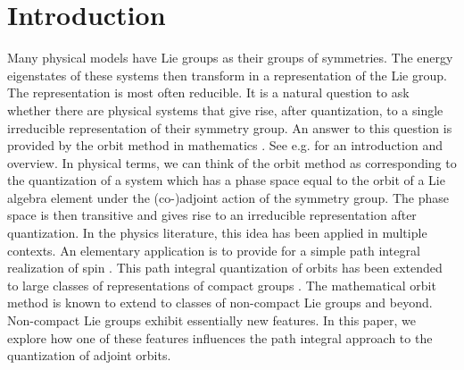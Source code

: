 \documentclass[12pt]{article}
\numberwithin{equation}{section}
\numberwithin{equation}{section}
\numberwithin{table}{section}\setlength{\multlinegap}{25pt}
\begin{document}
\hypersetup{pageanchor=true}


\setcounter{tocdepth}{2}
\tableofcontents

\section{Introduction}
Many physical models have Lie groups  as their groups of symmetries. The energy eigenstates of these systems then transform in a representation of the Lie group. The representation is most often reducible.  It is a natural question to ask whether there are physical systems that give rise, after quantization, to a single irreducible representation of their symmetry group. An answer to this question is provided by the orbit method in mathematics \cite{Kostant,Souriau}. See e.g. \cite{Kirillov} for an introduction and overview. In physical terms, we can think of the orbit method as corresponding to the quantization of a system which has a phase space equal to the  orbit of a Lie algebra element under the (co-)adjoint action of the symmetry group. The phase space is then transitive and gives rise to an irreducible representation after quantization. In the physics literature, this idea has been applied in multiple contexts. An elementary application is to provide for a simple path integral realization of spin \cite{Souriau,Nielsen:1987sa,Johnson:1988qm}. This path integral quantization of orbits has been extended to large classes of representations of compact groups \cite{Alekseev:1988vx}. 
The mathematical orbit method is known to extend to classes of non-compact Lie groups \cite{Kirillov} and beyond. Non-compact Lie groups exhibit essentially new features. In this paper, we explore how one of these features influences the path integral approach to the quantization of adjoint orbits. 
\end{document}

